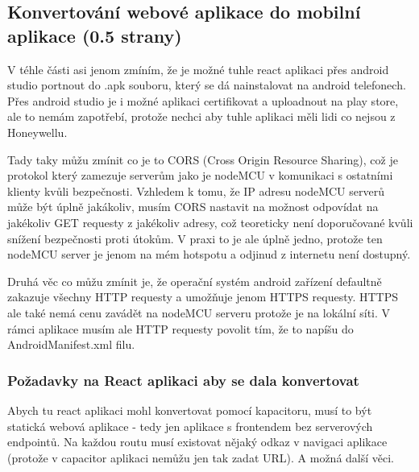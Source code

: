 \subsection{Konvertování webové aplikace do mobilní aplikace (0.5 strany)}\label{sec:KonvertovaniWeboveAplikaceDoMobilni}


V téhle části asi jenom zmíním, že je možné tuhle react aplikaci přes android studio portnout do .apk souboru, který se dá nainstalovat na android telefonech. Přes android studio je i možné aplikaci certifikovat a uploadnout na play store, ale to nemám zapotřebí, protože nechci aby tuhle aplikaci měli lidi co nejsou z Honeywellu.

Tady taky můžu zmínit co je to CORS (Cross Origin Resource Sharing), což je protokol který zamezuje serverům jako je nodeMCU v komunikaci s ostatními klienty kvůli bezpečnosti. Vzhledem k tomu, že IP adresu nodeMCU serverů může být úplně jakákoliv, musím CORS nastavit na možnost odpovídat na jakékoliv GET requesty z jakékoliv adresy, což teoreticky není doporučované kvůli snížení bezpečnosti proti útokům. V praxi to je ale úplně jedno, protože ten nodeMCU server je jenom na mém hotspotu a odjinud z internetu není dostupný.

Druhá věc co můžu zmínit je, že operační systém android zařízení defaultně zakazuje všechny HTTP requesty a umožňuje jenom HTTPS requesty. HTTPS ale také nemá cenu zavádět na nodeMCU serveru protože je na lokální síti. V rámci aplikace musím ale HTTP requesty povolit tím, že to napíšu do AndroidManifest.xml filu.


\subsubsection{Požadavky na React aplikaci aby se dala konvertovat}\label{sec:PozadavkyNaReactAplikaceAbySeDalaKonvertovat}

Abych tu react aplikaci mohl konvertovat pomocí kapacitoru, musí to být statická webová aplikace - tedy jen aplikace s frontendem bez serverových endpointů. Na každou routu musí existovat nějaký odkaz v navigaci aplikace (protože v capacitor aplikaci nemůžu jen tak zadat URL). A možná další věci.

